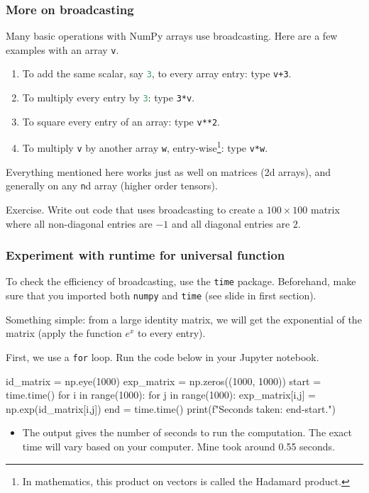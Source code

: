 \documentclass{beamer}
\newenvironment{codeblock}
    {\hfill\begin{beamerboxesrounded}[lower=codecol, width=0.8\textwidth]
    \medskip

    }
    { 
    \end{beamerboxesrounded}\hfill
    }
\theoremstyle{example}
\newcommand{\ct}[1]{\lstinline[language=Python]!#1!}
\newcommand{\ttt}[1]{{\small\texttt{#1}}}
\begin{document}
\begin{frame}
\frametitle{More on broadcasting}
Many basic operations with NumPy arrays use broadcasting. Here are a few examples with an array \ttt{v}.
\begin{enumerate}
    \item To add the same scalar, say \ct{3}, to every array entry: type \ttt{v+3}.
    \item To multiply every entry by \ct{3}: type \ttt{3*v}.
    \pause
    \item To square every entry of an array: type \ttt{v**2}.
    \item To multiply \ttt{v} by another array \ttt{w}, entry-wise\footnote{In mathematics, this product on vectors is called the Hadamard product.}: type \ttt{v*w}.
\end{enumerate}

\pause
Everything mentioned here works just as well on matrices (2d arrays), and generally on any \ttt{n}d array (higher order tensors).

\vspace*{12pt}
\pause
Exercise. \newline
Write out code that uses broadcasting to create a $100\times 100$ matrix where all non-diagonal entries are $-1$ and all diagonal entries are $2$.
\end{frame}

\begin{frame}[fragile]
\frametitle{Experiment with runtime for universal function}
To check the efficiency of broadcasting, use the \ttt{time} package. Beforehand, make sure that you imported both \ttt{numpy} and \ttt{time} (see slide in first section).

\pause
Something simple: from a large identity matrix, we will get the exponential of the matrix (apply the function $e^x$ to every entry).

\pause
First, we use a \ttt{for} loop. Run the code below in your Jupyter notebook.

\begin{codeblock}

\begin{python}
id_matrix = np.eye(1000)
exp_matrix = np.zeros((1000, 1000))
start = time.time()
for i in range(1000):
    for j in range(1000):
        exp_matrix[i,j] = np.exp(id_matrix[i,j])
end = time.time()
print(f"Seconds taken: {end-start}.")
\end{python}

\end{codeblock}

\vspace*{12pt}
\pause
\begin{itemize}
    \item[] The output gives the number of seconds to run the computation. The exact time will vary based on your computer. Mine took around 0.55 seconds.
\end{itemize}
\end{frame}
\end{document}
